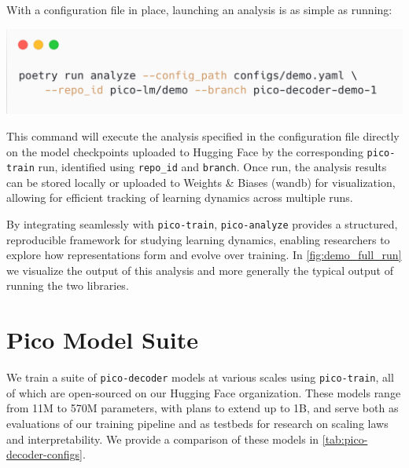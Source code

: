 With a configuration file in place, launching an analysis is as simple as running:

\begin{center}
    \includegraphics[width=0.7\columnwidth]{chapters/pico/figures/demo/demo_run_analyze.png}
\end{center}

This command will execute the analysis specified in the configuration file directly on the model checkpoints uploaded to Hugging Face by the corresponding \texttt{pico-train} run, identified using \verb|repo_id| and \verb|branch|. Once run, the analysis results can be stored locally or uploaded to Weights \& Biases (wandb) \citep{wandb} for visualization, allowing for efficient tracking of learning dynamics across multiple runs.  

By integrating seamlessly with \texttt{pico-train}, \texttt{pico-analyze} provides a structured, reproducible framework for studying learning dynamics, enabling researchers to explore how representations form and evolve over training. In \cref{fig:demo_full_run} we visualize the output of this analysis and more generally the typical output of running the two libraries. 


\section{Pico Model Suite}

We train a suite of \texttt{pico-decoder} models at various scales using \texttt{pico-train}, all of which are open-sourced on our Hugging Face organization. These models range from 11M to 570M parameters, with plans to extend up to 1B, and serve both as evaluations of our training pipeline and as testbeds for research on scaling laws and interpretability. We provide a comparison of these models in \cref{tab:pico-decoder-configs}.

